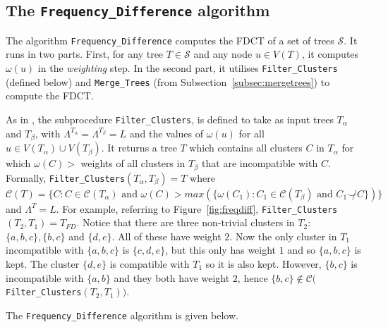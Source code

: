 \documentclass{article}
\newcommand{\compatible}{\smile}
\newcommand{\leafset}{\Lambda}
\newcommand{\weight}{\omega}
\newcommand{\TA}{T_\alpha}
\newcommand{\TB}{T_\beta}
\begin{document}
    \subsection{The \texttt{Frequency\_Difference} algorithm}

    The algorithm \texttt{Frequency\_Difference} \cite{jansson2018algorithms} computes the FDCT of a set of trees $\mathcal{S}$. It runs in two parts. First, for any tree $T \in \mathcal{S}$ and any node $u \in V(T)$, it computes $\weight(u)$ in the \textit{weighting} step. In the second part, it utilises \texttt{Filter\_Clusters} (defined below) and \texttt{Merge\_Trees} (from Subsection~\ref{subsec:mergetrees}) to compute the FDCT.

    As in \cite{jansson2018algorithms}, the subprocedure \texttt{Filter\_Clusters}, is defined to take as input trees $\TA$ and $\TB$, with $\leafset^{\TA} = \leafset^{\TB} = L$ and the values of $\weight(u)$ for all $u \in V(\TA) \cup V(\TB)$. It returns a tree $T$ which contains all clusters $C$ in $\TA$ for which $\weight(C) > $ weights of all clusters in $\TB$ that are incompatible with $C$. Formally, \texttt{Filter\_Clusters}$(\TA, \TB) = T$ where $\mathcal{C}(T) = \{C : C \in \mathcal{C}(\TA) \text{ and } \weight(C) > max(\{\weight(C_1) : C_1 \in \mathcal{C}(\TB) \text{ and } C_1 \not\compatible C\})\}$ and $\leafset^T = L$. For example, referring to Figure~\ref{fig:freqdiff}, \texttt{Filter\_Clusters}$(T_2, T_1) = T_{FD}$. Notice that there are three non-trivial clusters in $T_2$: $\{a, b, c\}, \{b, c\}$ and $\{d, e\}$. All of these have weight $2$. Now the only cluster in $T_1$ incompatible with $\{a, b, c\}$ is $\{c, d, e\}$, but this only has weight $1$ and so $\{a, b, c\}$ is kept. The cluster $\{d, e\}$ is compatible with $T_1$ so it is also kept. However, $\{b, c\}$ is incompatible with $\{a, b\}$ and they both have weight $2$, hence $\{b, c\} \not\in \mathcal{C}($\texttt{Filter\_Clusters}$(T_2, T_1))$.

    The \texttt{Frequency\_Difference} algorithm is given below.
\end{document}
